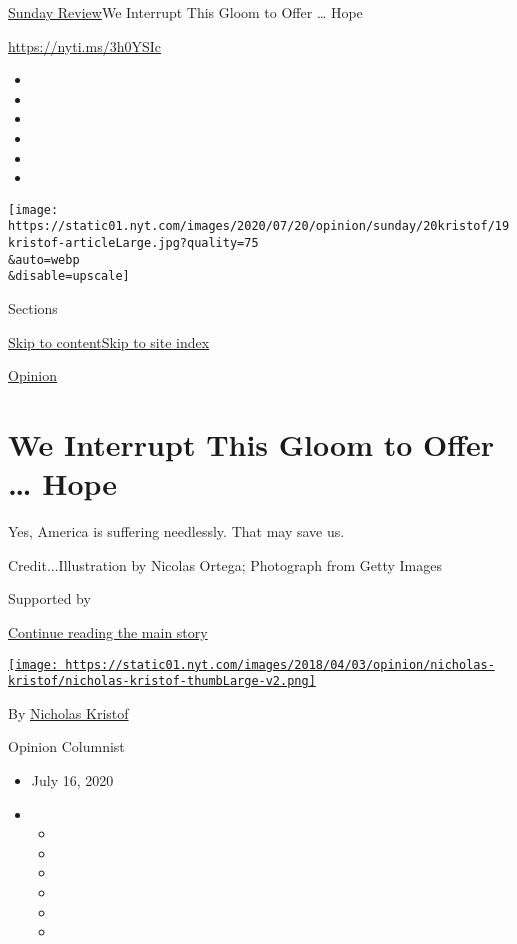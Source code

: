 \href{/section/opinion/sunday}{Sunday Review}\textbar{}We Interrupt This
Gloom to Offer \ldots{} Hope

\href{https://nyti.ms/3h0YSIc}{https://nyti.ms/3h0YSIc}

\begin{itemize}
\item
\item
\item
\item
\item
\item
\end{itemize}

\texttt{[image: https://static01.nyt.com/images/2020/07/20/opinion/sunday/20kristof/19kristof-articleLarge.jpg?quality=75\\\&auto=webp\\\&disable=upscale]}

Sections

\protect\hyperlink{site-content}{Skip to
content}\protect\hyperlink{site-index}{Skip to site index}

\href{/section/opinion}{Opinion}

\hypertarget{we-interrupt-this-gloom-to-offer--hope}{%
\section{We Interrupt This Gloom to Offer \ldots{}
Hope}\label{we-interrupt-this-gloom-to-offer--hope}}

Yes, America is suffering needlessly. That may save us.

Credit...Illustration by Nicolas Ortega; Photograph from Getty Images

Supported by

\protect\hyperlink{after-sponsor}{Continue reading the main story}

\href{https://www.nytimes.com/column/nicholas-kristof}{\texttt{[image: https://static01.nyt.com/images/2018/04/03/opinion/nicholas-kristof/nicholas-kristof-thumbLarge-v2.png]}}

By \href{https://www.nytimes.com/column/nicholas-kristof}{Nicholas
Kristof}

Opinion Columnist

\begin{itemize}
\item
  July 16, 2020
\item
  \begin{itemize}
  \item
  \item
  \item
  \item
  \item
  \item
  \end{itemize}
\end{itemize}

